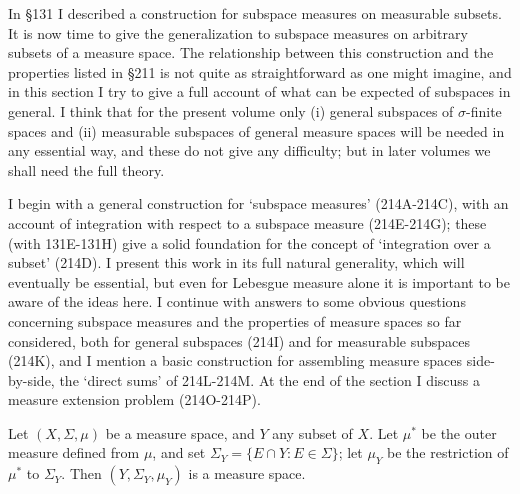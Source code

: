 
\def\chaptername{Taxonomy of measure spaces}
\def\sectionname{Subspaces}


In \S131 I described a construction for subspace measures on measurable
subsets.   It is now time to give the generalization to subspace
measures
on arbitrary subsets of a measure space.   The relationship between this
construction and the properties listed in \S211 is not quite as
straightforward as one might imagine, and in this section I try to give
a full account of what can be expected of subspaces in general.   I
think that for the present volume only (i) general subspaces of
$\sigma$-finite spaces and
(ii) measurable subspaces of general measure spaces will be
needed in any essential way, and these do not give any difficulty;  but
in later volumes we shall need the full theory.

I begin with a general construction for `subspace measures'
(214A-214C), %
with an account of integration with respect to a subspace
measure (214E-214G); %
these (with 131E-131H) %
give a solid foundation for
the concept of `integration over a subset' (214D).   I present
this work in its full natural generality, which will eventually be
essential, but even for Lebesgue measure alone it is important to be
aware of the ideas here.    I continue with answers to some obvious
questions concerning subspace measures and the properties of measure
spaces so far considered, both for general subspaces (214I) and for
measurable subspaces (214K), and I mention a basic construction for
assembling measure spaces side-by-side, the `direct sums' of 214L-214M.
At the end of the section I discuss a measure extension problem
(214O-214P).

 Let $(X,\Sigma,\mu)$ be a measure space, and
$Y$ any subset of $X$.   Let $\mu^*$ be the outer measure defined from
$\mu$, and set $\Sigma_Y=\{E\cap Y:E\in\Sigma\}$;  let
$\mu_Y$ be the restriction of $\mu^*$ to $\Sigma_Y$.   Then
$(Y,\Sigma_Y,\mu_Y)$ is a measure space.

